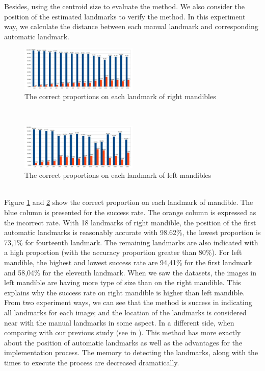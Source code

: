 \documentclass[twoside,twocolumn,10pt]{article}
\begin{document}
Besides, using the centroid size to evaluate the method. We also
consider the position of the estimated landmarks to verify the method. In this experiment
way, we calculate the distance between each manual landmark and
corresponding automatic landmark.
\begin{figure}[htb]
    \centering
    \includegraphics[width=0.5\textwidth]{./images/md_chartlms}
    \caption{The correct proportions on each landmark of right mandibles }
    \label{figmdresultlm}
\end{figure}~\\
\begin{figure}[htb]
    \centering
    \includegraphics[width=0.5\textwidth]{./images/mg_chartlms}
    \caption{The correct proportions on each landmark of left mandibles }
    \label{figmgresultlm}
\end{figure}~\\
Figure \ref{figmdresultlm} and \ref{figmgresultlm} show the correct proportion on each landmark of mandible. The blue column is presented for the success rate. The orange column is expressed as the incorrect rate. With 18 landmarks of right mandible, the position of the first automatic landmarks is reasonably accurate with 98.62\%, the lowest proportion is 73,1\% for fourteenth landmark. The remaining landmarks are also indicated with a high proportion (with the accuracy proportion greater than 80\%). For left mandible, the highest and lowest success rate are 94,41\% for the first landmark and 58,04\% for the eleventh landmark. When we saw the datasets, the images in left mandible are having more type of size than on the right mandible. This explains why the success rate on right mandible is higher than left mandible.\\

From two experiment ways, we can see that the method is success in
indicating all landmarks for each image; and the location of the
landmarks is considered near with the manual landmarks in some
aspect. In a different side, when comparing with our previous study (see in
\cite{leestimating}). This method has more exactly about the position of
automatic landmarks as well as the advantages for the implementation
process. The memory to detecting the landmarks, along with the times
to execute the process are decreased dramatically.
\end{document}
